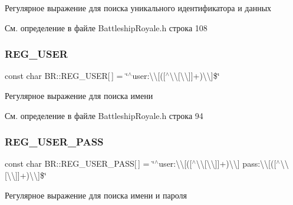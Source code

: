 Регулярное выражение для поиска уникального идентификатора и данных


\begin{DoxyCode}{0}
\end{DoxyCode}
 

См. определение в файле Battleship\+Royale.\+h строка 108

\mbox{\label{namespace_b_r_adf62830a86680a1b129dc6a865c8ca5f}} 
\subsubsection{\texorpdfstring{REG\_USER}{REG\_USER}}
{\footnotesize\ttfamily const char B\+R\+::\+R\+E\+G\+\_\+\+U\+S\+ER\mbox{[}$\,$\mbox{]} = \char`\"{}$^\wedge$user\+:\textbackslash{}\textbackslash{}\mbox{[}(\mbox{[}$^\wedge$\textbackslash{}\textbackslash{}\mbox{[}\textbackslash{}\textbackslash{}\mbox{]}\mbox{]}+)\textbackslash{}\textbackslash{}\mbox{]}\$\char`\"{}}

Регулярное выражение для поиска имени


\begin{DoxyCode}{0}
\end{DoxyCode}
 

См. определение в файле Battleship\+Royale.\+h строка 94

\mbox{\label{namespace_b_r_a81134999acb4e2183d0968fad32d055e}} 
\subsubsection{\texorpdfstring{REG\_USER\_PASS}{REG\_USER\_PASS}}
{\footnotesize\ttfamily const char B\+R\+::\+R\+E\+G\+\_\+\+U\+S\+E\+R\+\_\+\+P\+A\+SS\mbox{[}$\,$\mbox{]} = \char`\"{}$^\wedge$user\+:\textbackslash{}\textbackslash{}\mbox{[}(\mbox{[}$^\wedge$\textbackslash{}\textbackslash{}\mbox{[}\textbackslash{}\textbackslash{}\mbox{]}\mbox{]}+)\textbackslash{}\textbackslash{}\mbox{]} pass\+:\textbackslash{}\textbackslash{}\mbox{[}(\mbox{[}$^\wedge$\textbackslash{}\textbackslash{}\mbox{[}\textbackslash{}\textbackslash{}\mbox{]}\mbox{]}+)\textbackslash{}\textbackslash{}\mbox{]}\$\char`\"{}}

Регулярное выражение для поиска имени и пароля


